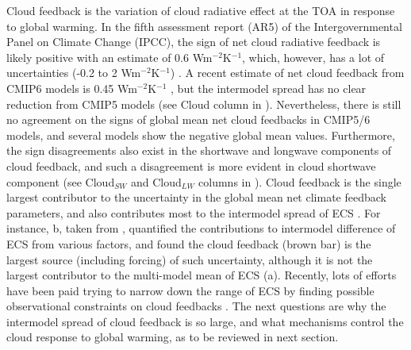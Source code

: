 Cloud feedback is the variation of cloud radiative effect at the TOA in response to global warming. In the fifth assessment report (AR5) of the Intergovernmental Panel on Climate Change (IPCC), the sign of net cloud radiative feedback is likely positive with an estimate of 0.6 Wm$^{-2}$K$^{-1}$, which, however, has a lot of uncertainties (-0.2 to 2 Wm$^{-2}$K$^{-1}$) \citep{Stocker2013}. A recent estimate of net cloud feedback from CMIP6 models is 0.45 Wm$^{-2}$K$^{-1}$ \citep{Zelinka2020causes,Sherwood2020}, but the intermodel spread has no clear reduction from CMIP5 models (see Cloud column in ). Nevertheless, there is still no agreement on the signs of global mean net cloud feedbacks in CMIP5/6 models, and several models show the negative global mean values. Furthermore, the sign disagreements also exist in the shortwave and longwave components of cloud feedback, and such a disagreement is more evident in cloud shortwave component (see Cloud$_{SW}$ and Cloud$_{LW}$ columns in ). Cloud feedback is the single largest contributor to the uncertainty in the global mean net climate feedback parameters, and also contributes most to the intermodel spread of ECS \citep{Bony2005,Soden2006,Dufresne2008assessment,Colman2011tropospheric,Vial2013,Ceppi2017,Zelinka2020causes,Sherwood2020}. For instance, b, taken from \cite{Dufresne2008assessment}, quantified the contributions to intermodel difference of ECS from various factors, and found the cloud feedback (brown bar) is the largest source (including forcing) of such uncertainty, although it is not the largest contributor to the multi-model mean of ECS (a). Recently, lots of efforts have been paid trying to narrow down the range of ECS by finding possible observational constraints on cloud feedbacks \citep[e.g.,][]{Cesana2021,Myers2021}. The next questions are why the intermodel spread of cloud feedback is so large, and what mechanisms control the cloud response to global warming, as to be reviewed in next section.



